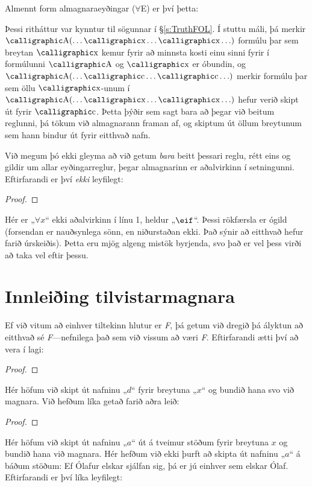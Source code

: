 Almennt form almagnaraeyðingar ($\forall$E) er því þetta:

Þessi ritháttur var kynntur til sögunnar í \S\ref{s:TruthFOL}. Í stuttu máli, þá merkir $\meta{A}(\ldots \meta{x} \ldots \meta{x}\ldots)$ formúlu þar sem breytan $\meta{x}$ kemur fyrir að minnsta kosti einu sinni fyrir í formúlunni $\meta{A}$ og $\meta{x}$ er óbundin, og $\meta{A}(\ldots \meta{c} \ldots \meta{c}\ldots)$ merkir formúlu þar sem öllu $\meta{x}$-unum í $\meta{A}(\ldots \meta{x} \ldots \meta{x}\ldots)$ hefur verið skipt út fyrir $\meta{c}$. Þetta þýðir sem sagt bara að þegar við beitum reglunni, þá tökum við almagnarann framan af, og skiptum út öllum breytunum sem hann bindur út fyrir eitthvað nafn. 

Við megum þó ekki gleyma að við getum \emph{bara} beitt þessari reglu, rétt eins og gildir um allar eyðingarreglur, þegar almagnarinn er aðalvirkinn í setningunni. Eftirfarandi er því \emph{ekki} leyfilegt: 

\begin{proof}
\end{proof}
Hér er „$\forall x$“ ekki aðalvirkinn í línu 1, heldur „$\eif$“. Þessi rökfærsla er ógild (forsendan er nauðsynlega sönn, en niðurstaðan ekki. Það sýnir að eitthvað hefur farið úrskeiðis). Þetta eru mjög algeng mistök byrjenda, svo það er vel þess virði að taka vel eftir þessu.

\section{Innleiðing tilvistarmagnara}
Ef við vitum að einhver tiltekinn hlutur er \emph{F}, þá getum við dregið þá ályktun að eitthvað sé \emph{F}---nefnilega það sem við vissum að væri \emph{F}. Eftirfarandi ætti því að vera í lagi:
\begin{proof}
	 
\end{proof}
Hér höfum við skipt út nafninu „$d$“ fyrir breytuna „$x$“ og bundið hana svo við magnara. Við hefðum líka getað farið aðra leið:
\begin{proof}
	 
\end{proof}
Hér höfum við skipt út nafninu „$a$“ út á tveimur stöðum fyrir breytuna $x$ og bundið hana við magnara. Hér hefðum við ekki þurft að skipta út nafninu „$a$“ á báðum stöðum: Ef Ólafur elskar sjálfan sig, þá er jú einhver sem elskar Ólaf. Eftirfarandi er því líka leyfilegt: 

